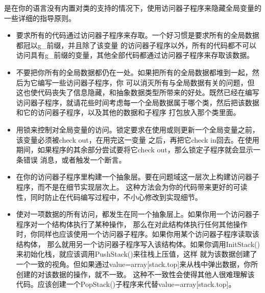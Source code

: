 \documentclass{article}
\begin{document}
\begin{itemize}
    是在你的语言没有内置对类的支持的情况下，使用访问器子程序来隐藏全局变量的一些详细的指导原则。
    \begin{itemize}
        \item 要求所有的代码通过访问器子程序来存取。一个好习惯是要求所有的全局数据都冠以g\_前缀，并且除了该变量
        的访问器子程序以外，所有的代码都不可以访问具有g\_前缀的变量，其他全部代码都通过访问器子程序来存取该数据。
        \item 不要把你所有的全局数据都仍在一处。如果把所有的全局数据都堆到一起，然后为它编写一些访问器子程序，你
        可以消灭所有与全局数据有关的问题，但这也使代码丧失了信息隐藏，和抽象数据类型所带来的好处。既然已经在编写
        访问器子程序，就请花些时间考虑每一个全局数据属于哪个类，然后把该数据和它的访问器子程序，以及其他的数据和子程序
        打包放入那个类里面。
        \item 用锁来控制对全局变量的访问。锁定要求在使用或则更新一个全局变量之前，该变量必须被check out，在用完这一变量
        之后，再把它check in回去。在使用期间，如果程序的其余部分尝试要将它check out，那么锁定子程序就会显示一条错误
        消息，或者触发一个断言。
        \item 在你的访问器子程序里构建一个抽象层。要在问题域这一层次上构建访问器子程序，而不是在细节实现层次上。
        这种方法会为你的代码带来更好的可读性，同时防止在代码编写过程中，不小心修改到实现细节。
        \item 使对一项数据的所有访问，都发生在同一个抽象层上。如果你用一个访问器子程序对一个结构体执行了某种操作，
        那么在对此结构体执行任何其他操作时，你同样也应该使用一个访问器子程序。如果你用某个访问器子程序读取该结构体，
        那么就用另一个访问器子程序写入该结构体。如果你调用InitStack()来初始化栈，就应该调用PushStack()来往栈上压值，这样
        就为该数据创建了一个一致的视角。但如果通过value=array[stack.top]来从栈中弹出数据，你所创建的对该数据的操作，就不一致。
        这种不一致性会使得其他人很难理解该代码。应该创建一个PopStack()子程序来代替value=array[stack.top]。
    \end{itemize}
\end{itemize}
\end{document}
